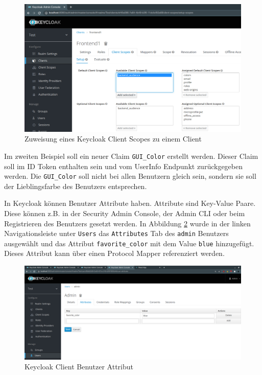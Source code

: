 \begin{figure}[!ht]
	\centering
	\includegraphics[width=1\textwidth]{Images/EbertScherer/KeycloakAddAudClientScope.PNG}
	\caption{Zuweisung eines Keycloak Client Scopes zu einem Client}
	\label{fig:EB_Keycloak Client Scope einem Client zuweisen}
\end{figure}

Im zweiten Beispiel soll ein neuer Claim \texttt{GUI\_Color} erstellt werden. Dieser Claim soll im ID Token enthalten sein und vom UserInfo Endpunkt zurückgegeben werden. Die \texttt{GUI\_Color} soll nicht bei allen Benutzern gleich sein, sondern sie soll der Lieblingsfarbe des Benutzers entsprechen.

In Keycloak können Benutzer Attribute haben. Attribute sind Key-Value Paare. Diese können z.B. in der Security Admin Console, der Admin CLI oder beim Registrieren des Benutzers gesetzt werden. In Abbildung \ref{fig:EB_Keycloak Client User Attribut} wurde in der linken Navigationsleiste unter \texttt{Users} das \texttt{Attributes} Tab des \texttt{admin} Benutzers ausgewählt und das Attribut \texttt{favorite\_color} mit dem Value \texttt{blue} hinzugefügt. Dieses Attribut kann über einen Protocol Mapper referenziert werden.

\begin{figure}[!ht]
	\centering
	\includegraphics[width=1\textwidth]{Images/EbertScherer/KeycloakNewUserAttribute.PNG}
	\caption{Keycloak Client Benutzer Attribut}
	\label{fig:EB_Keycloak Client User Attribut}
\end{figure}

